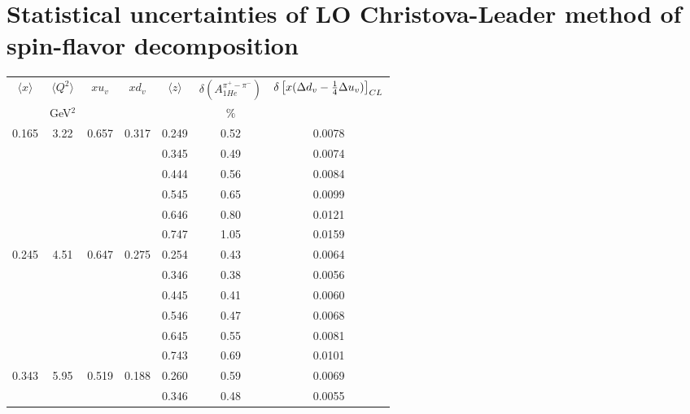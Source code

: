 \section{ Statistical uncertainties of LO Christova-Leader method of spin-flavor decomposition}
\begin{table}[htbp]
\begin{center}
\begin{tabular}{|ccccc||c|c|}
\hline
$\langle x \rangle $   & $ \langle Q^2 \rangle $   & $x  u_v$ & $x d_v$ & $\langle z \rangle$ & $\delta \left(A_{1He}^{\pi^+ - \pi^-} \right)$  &
$\delta \left[x( \Delta d_v -{1 \over 4} \Delta u_v )\right]_{CL}$  \\
                       & GeV$^2$              &          &    &       &  $\%$    &                                                              \\ \hline \hline
   0.165 &    3.22 &   0.657 &    0.317 &    0.249 &      0.52 &    0.0078 \\
         &          &          &          &    0.345 &      0.49 &    0.0074 \\
         &          &          &          &    0.444 &      0.56 &    0.0084 \\
         &          &          &          &    0.545 &      0.65 &    0.0099 \\
         &          &          &          &    0.646 &      0.80 &    0.0121 \\
         &          &          &          &    0.747 &      1.05 &    0.0159 \\
   0.245 &    4.51 &   0.647 &    0.275 &    0.254 &      0.43 &    0.0064 \\
         &          &          &          &    0.346 &      0.38 &    0.0056 \\
         &          &          &          &    0.445 &      0.41 &    0.0060 \\
         &          &          &          &    0.546 &      0.47 &    0.0068 \\
         &          &          &          &    0.645 &      0.55 &    0.0081 \\
         &          &          &          &    0.743 &      0.69 &    0.0101 \\
   0.343 &    5.95 &   0.519 &    0.188 &    0.260 &      0.59 &    0.0069 \\
         &          &          &          &    0.346 &      0.48 &    0.0055 \\

\end{tabular}
\end{center}
\end{table}
